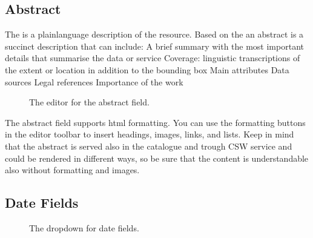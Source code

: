 \documentclass[letterpaper,10pt,english]{sphinxmanual}
\begin{document}
\subsection{Abstract}
\label{\detokenize{03_managing_metadata:abstract}}
\sphinxAtStartPar
The  is a plain\sphinxhyphen{}language description of the resource.
Based on the 
an abstract is a succinct description that can include:
\sphinxhyphen{} A brief summary with the most important details that summarise
the data or service
\sphinxhyphen{} Coverage: linguistic transcriptions of the extent or location in
addition to the bounding box
\sphinxhyphen{} Main attributes
\sphinxhyphen{} Data sources
\sphinxhyphen{} Legal references
\sphinxhyphen{} Importance of the work

\begin{figure}[htbp]
\centering
\capstart

\noindent{}
\caption{The editor for the abstract field.}\label{\detokenize{03_managing_metadata:id5}}\end{figure}

\sphinxAtStartPar
The abstract field supports html formatting.
You can use the formatting buttons in the editor toolbar to insert headings,
images, links, and lists.
Keep in mind that the abstract is served also in the catalogue and trough CSW service
and could be rendered in different ways, so be sure that the content is understandable also without formatting and images.


\subsection{Date Fields}
\label{\detokenize{03_managing_metadata:date-fields}}
\begin{figure}[htbp]
\centering
\capstart

\noindent{}
\caption{The dropdown for date fields.}\label{\detokenize{03_managing_metadata:id6}}\end{figure}
\end{document}
